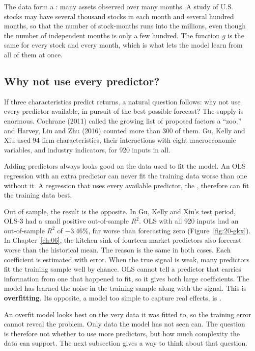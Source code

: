 The data form a : many assets observed over many months. A study of U.S. stocks may have several thousand stocks in each month and several hundred months, so that the number of stock-months runs into the millions, even though the number of independent months is only a few hundred. The function $g$ is the same for every stock and every month, which is what lets the model learn from all of them at once.

\subsection{Why not use every predictor?}
\label{sec:20-why}

If three characteristics predict returns, a natural question follows: why not use every predictor available, in pursuit of the best possible forecast? The supply is enormous. 
Cochrane (2011) called the growing list of proposed factors a ``zoo,'' and Harvey, Liu and Zhu (2016) counted more than 300 of them.
Gu, Kelly and Xiu used 94 firm characteristics, their interactions with eight macroeconomic variables, and industry indicators, for 920 inputs in all.

Adding predictors always looks good on the data used to fit the model. An OLS regression with an extra predictor can never fit the training data worse than one without it. A regression that uses every available predictor, the , therefore can fit the training data best.

Out of sample, the result is the opposite. In Gu, Kelly and Xiu's test period, OLS-3 had a small positive out-of-sample $R^2$. OLS with all 920 inputs had an out-of-sample $R^2$ of $-3.46\%$, far worse than forecasting zero (Figure~\ref{fig:20-gkx}). In Chapter~\ref{ch:06}, the kitchen sink of fourteen market predictors also forecast worse than the historical mean. The reason is the same in both cases. Each coefficient is estimated with error. When the true signal is weak, many predictors fit the training sample well by chance. OLS cannot tell a predictor that carries information from one that happened to fit, so it gives both large coefficients. The model has learned the noise in the training sample along with the signal. This is \textbf{overfitting}. Its opposite, a model too simple to capture real effects, is .

An overfit model looks best on the very data it was fitted to, so the training error cannot reveal the problem. Only data the model has not seen can. The question is therefore not whether to use more predictors, but how much complexity the data can support. The next subsection gives a way to think about that question.

